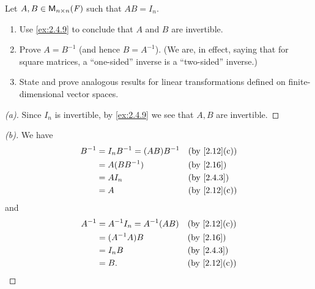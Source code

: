 \begin{ex}\label{ex:2.4.10}
  Let \(A, B \in \ms[n][n][\F]\) such that \(AB = I_n\).
  \begin{enumerate}
    \item Use \cref{ex:2.4.9} to conclude that \(A\) and \(B\) are invertible.
    \item Prove \(A = B^{-1}\) (and hence \(B = A^{-1}\)).
          (We are, in effect, saying that for square matrices, a ``one-sided'' inverse is a ``two-sided'' inverse.)
    \item State and prove analogous results for linear transformations defined on finite-dimensional vector spaces.
  \end{enumerate}
\end{ex}

\begin{proof}[(a)]
  Since \(I_n\) is invertible, by \cref{ex:2.4.9} we see that \(A, B\) are invertible.
\end{proof}

\begin{proof}[(b)]
  We have
  \begin{align*}
    B^{-1} & = I_n B^{-1} = (AB) B^{-1} &  & \by{2.12}[c] \\
           & = A (B B^{-1})             &  & \by{2.16}    \\
           & = A I_n                    &  & \by{2.4.3}   \\
           & = A                        &  & \by{2.12}[c]
  \end{align*}
  and
  \begin{align*}
    A^{-1} & = A^{-1} I_n = A^{-1} (AB) &  & \by{2.12}[c] \\
           & = (A^{-1} A) B             &  & \by{2.16}    \\
           & = I_n B                    &  & \by{2.4.3}   \\
           & = B.                       &  & \by{2.12}[c]
  \end{align*}
\end{proof}

